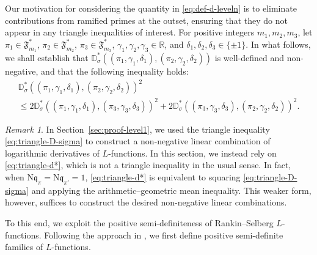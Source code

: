 \documentclass[12pt,reqno]{amsart}
\theoremstyle{remark}
\newtheorem*{rek}{Remark}
\numberwithin{equation}{section}
\begin{document}
    
    Our motivation for considering the quantity in \eqref{eq:def-d-leveln} is to eliminate contributions from ramified primes at the outset, ensuring that they do not appear in any triangle inequalities of interest.  For positive integers $m_1, m_2, m_3$, let $\pi_1 \in \mathfrak{F}_{m_1}^*$, $\pi_2 \in \mathfrak{F}_{m_2}^*$, $\pi_3 \in \mathfrak{F}_{m_3}^*$, $\gamma_1, \gamma_{2}, \gamma_{3} \in \mathbb{R}$, and $\delta_1, \delta_{2}, \delta_{3} \in \{\pm1\}$. 
  In what follows, we shall establish that $\mathbb{D}^*_{\sigma}((\pi_1, \gamma_1, \delta_1), (\pi_2, \gamma_2, \delta_2))$ is well-defined and non-negative, and that the following inequality holds:
  \begin{multline}\label{eq:triangle-d*}
   \mathbb{D}^*_{\sigma}((\pi_1, \gamma_1, \delta_1), (\pi_2, \gamma_2, \delta_2))^2\\ \le 2\mathbb{D}^*_{\sigma}((\pi_1, \gamma_1, \delta_1), (\pi_3, \gamma_3, \delta_3))^2 + 2\mathbb{D}^*_{\sigma}((\pi_3, \gamma_3, \delta_3), (\pi_2, \gamma_2,\delta_2))^2.
\end{multline}
\begin{rek}
    In Section~\ref{sec:proof-level1}, we used the triangle inequality \eqref{eq:triangle-D-sigma} to construct a non-negative linear combination of logarithmic derivatives of $L$-functions. In this section, we instead rely on  \eqref{eq:triangle-d*}, which is not a triangle inequality in the usual sense. In fact, when $ \mathrm{N}\mathfrak{q}_\pi = \mathrm{N}\mathfrak{q}_{\pi'} = 1$, \eqref{eq:triangle-d*} is equivalent to squaring \eqref{eq:triangle-D-sigma} and applying the arithmetic--geometric mean inequality. This weaker form, however,  suffices to construct the desired non-negative linear combinations.
\end{rek}
    To this end, we exploit the positive semi-definiteness of Rankin--Selberg $L$-functions. Following the approach in \cite{LP}, we first define positive semi-definite families of $L$-functions.
\end{document}
